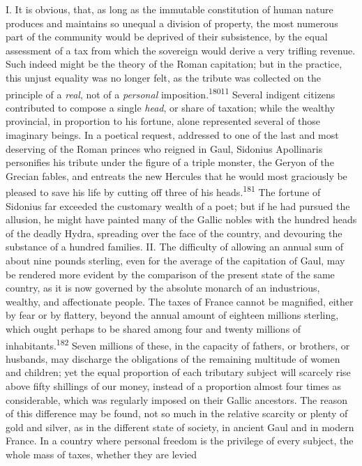 I. It is obvious, that, as long as the immutable constitution of
human nature produces and maintains so unequal a division of
property, the most numerous part of the community would be
deprived of their subsistence, by the equal assessment of a tax
from which the sovereign would derive a very trifling revenue.
Such indeed might be the theory of the Roman capitation; but in
the practice, this unjust equality was no longer felt, as the
tribute was collected on the principle of a \textit{real}, not of a
\textit{personal} imposition.\textsuperscript{18011} Several indigent citizens
contributed to compose a single \textit{head}, or share of taxation;
while the wealthy provincial, in proportion to his fortune, alone
represented several of those imaginary beings. In a poetical
request, addressed to one of the last and most deserving of the
Roman princes who reigned in Gaul, Sidonius Apollinaris
personifies his tribute under the figure of a triple monster, the
Geryon of the Grecian fables, and entreats the new Hercules that
he would most graciously be pleased to save his life by cutting
off three of his heads.\textsuperscript{181} The fortune of Sidonius far exceeded
the customary wealth of a poet; but if he had pursued the
allusion, he might have painted many of the Gallic nobles with
the hundred heads of the deadly Hydra, spreading over the face of
the country, and devouring the substance of a hundred families.
II. The difficulty of allowing an annual sum of about nine pounds
sterling, even for the average of the capitation of Gaul, may be
rendered more evident by the comparison of the present state of
the same country, as it is now governed by the absolute monarch
of an industrious, wealthy, and affectionate people. The taxes of
France cannot be magnified, either by fear or by flattery, beyond
the annual amount of eighteen millions sterling, which ought
perhaps to be shared among four and twenty millions of
inhabitants.\textsuperscript{182} Seven millions of these, in the capacity of
fathers, or brothers, or husbands, may discharge the obligations
of the remaining multitude of women and children; yet the equal
proportion of each tributary subject will scarcely rise above
fifty shillings of our money, instead of a proportion almost four
times as considerable, which was regularly imposed on their
Gallic ancestors. The reason of this difference may be found, not
so much in the relative scarcity or plenty of gold and silver, as
in the different state of society, in ancient Gaul and in modern
France. In a country where personal freedom is the privilege of
every subject, the whole mass of taxes, whether they are levied
